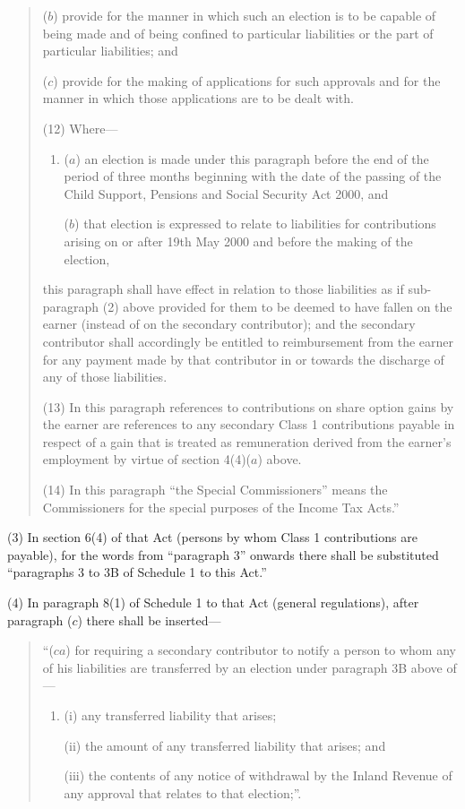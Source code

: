 \documentclass[12pt,a4paper]{article}
\begin{document}
\begin{quotation}
\begin{enumerate}
($b$) provide for the manner in which such an election is to be capable of being made and of being confined to particular liabilities or the part of particular liabilities; and

($c$) provide for the making of applications for such approvals and for the manner in which those applications are to be dealt with.
\end{enumerate}

(12) Where—
\begin{enumerate}\item[]
($a$) an election is made under this paragraph before the end of the period of three months beginning with the date of the passing of the Child Support, Pensions and Social Security Act 2000, and

($b$) that election is expressed to relate to liabilities for contributions arising on or after 19th May 2000 and before the making of the election,
\end{enumerate}
this paragraph shall have effect in relation to those liabilities as if sub-paragraph (2)  above provided for them to be deemed to have fallen on the earner (instead of on the secondary contributor); and the secondary contributor shall accordingly be entitled to reimbursement from the earner for any payment made by that contributor in or towards the discharge of any of those liabilities.

(13) In this paragraph references to contributions on share option gains by the earner are references to any secondary Class 1 contributions payable in respect of a gain that is treated as remuneration derived from the earner’s employment by virtue of section 4(4)($a$)  above.

(14) In this paragraph “the Special Commissioners” means the Commissioners for the special purposes of the Income Tax Acts.”
\end{quotation}

(3) In section 6(4)  of that Act (persons by whom Class 1 contributions are payable), for the words from “paragraph 3” onwards there shall be substituted “paragraphs 3 to 3B of Schedule 1 to this Act.”

(4) In paragraph 8(1)  of Schedule 1 to that Act (general regulations), after paragraph ($c$)  there shall be inserted—
\begin{quotation}
“($ca$) for requiring a secondary contributor to notify a person to whom any of his liabilities are transferred by an election under paragraph 3B above of—
\begin{enumerate}\item[]
(i) any transferred liability that arises;

(ii) the amount of any transferred liability that arises; and

(iii) the contents of any notice of withdrawal by the Inland Revenue of any approval that relates to that election;”.
\end{enumerate}
\end{quotation}
\end{document}
